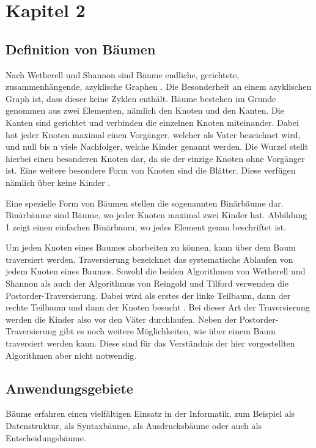 \chapter{Kapitel 2}
\label{chap:kapitel2}

\section{Definition von Bäumen}

Nach Wetherell und Shannon sind Bäume endliche, gerichtete, zusammenhängende, azyklische Graphen \cite[]{q1}. 
Die Besonderheit an einem azyklischen Graph ist, dass dieser keine Zyklen enthält. Bäume bestehen im Grunde genommen 
aus zwei Elementen, nämlich den Knoten und den Kanten. Die Kanten sind gerichtet und verbinden die einzelnen 
Knoten miteinander. Dabei hat jeder Knoten maximal einen Vorgänger, welcher als Vater bezeichnet wird, und null 
bis n viele Nachfolger, welche Kinder genannt werden. Die Wurzel stellt hierbei einen besonderen Knoten dar, da sie der 
einzige Knoten ohne Vorgänger ist. Eine weitere besondere Form von Knoten sind die Blätter. Diese verfügen nämlich über 
keine Kinder \cite[]{q4}.

Eine spezielle Form von Bäumen stellen die sogenannten Binärbäume dar. 
Binärbäume sind Bäume, wo jeder Knoten maximal zwei Kinder hat. Abbildung 1 
zeigt einen einfachen Binärbaum, wo jedes Element genau beschriftet ist. 

Um jeden Knoten eines Baumes abarbeiten zu können, kann über dem Baum 
traversiert werden. Traversierung bezeichnet das systematische Ablaufen 
von jedem Knoten eines Baumes. Sowohl die beiden Algorithmen von Wetherell 
und Shannon als auch der Algorithmus von Reingold und Tilford verwenden die 
Postorder-Traversierung. Dabei wird als erstes der linke Teilbaum, dann der 
rechte Teilbaum und dann der Knoten besucht \cite[]{q4}. Bei dieser Art der 
Traversierung werden die Kinder also vor den Väter durchlaufen. Neben der 
Postorder-Traversierung gibt es noch weitere Möglichkeiten, wie über einem 
Baum traversiert werden kann. Diese sind für das Verständnis der hier 
vorgestellten Algorithmen aber nicht notwendig.


\section{Anwendungsgebiete}

Bäume erfahren einen vielfältigen Einsatz in der Informatik, zum Beispiel 
als Datenstruktur, als Syntaxbäume, als Ausdrucksbäume oder auch als 
Entscheidungsbäume.

